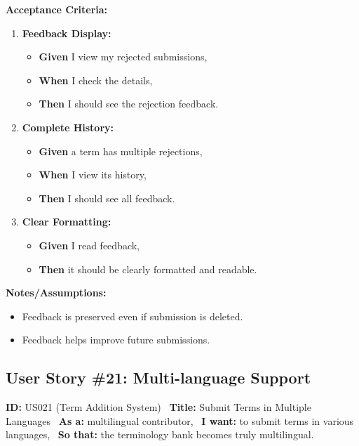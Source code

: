 \documentclass[12pt]{article}
\begin{document}
\vspace{1em}
\textbf{Acceptance Criteria:}
\begin{enumerate}
\item \textbf{Feedback Display:}
\begin{itemize}
\item \textbf{Given} I view my rejected submissions,
\item \textbf{When} I check the details,
\item \textbf{Then} I should see the rejection feedback.
\end{itemize}

\item \textbf{Complete History:}
\begin{itemize}
    \item \textbf{Given} a term has multiple rejections,
    \item \textbf{When} I view its history,
    \item \textbf{Then} I should see all feedback.
\end{itemize}

\item \textbf{Clear Formatting:}
\begin{itemize}
    \item \textbf{Given} I read feedback,
    \item \textbf{Then} it should be clearly formatted and readable.
\end{itemize}
\end{enumerate}

\vspace{1em}
\textbf{Notes/Assumptions:}
\begin{itemize}
\item Feedback is preserved even if submission is deleted.
\item Feedback helps improve future submissions.
\end{itemize}

\subsection{User Story \#21: Multi-language Support}
\textbf{ID:} US021 (Term Addition System) \
\textbf{Title:} Submit Terms in Multiple Languages \
\textbf{As a:} multilingual contributor, \
\textbf{I want:} to submit terms in various languages, \
\textbf{So that:} the terminology bank becomes truly multilingual.
\end{document}
